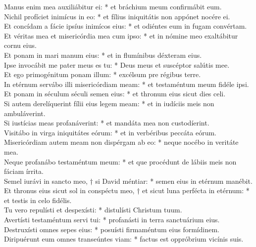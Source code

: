 {	%
	Manus enim mea auxiliábitur ei: * et bráchium meum confirmábit eum. \\
	Nichil profíciet inimícus in eo: * et fílius iniquitátis non appónet nocére ei. \\
	Et concídam a fácie ipsíus inimícos eius: * et odiéntes eum in fugam convértam. \\
	Et véritas mea et misericórdia mea cum ipso: * et in nómine meo exaltábitur cornu eius. \\
	Et ponam in mari manum eius: * et in flumínibus déxteram eius. \\
	Ipse invocábit me pater meus es tu: * Deus meus et suscéptor salútis mee. \\
	Et ego primogénitum ponam illum: * excélsum pre régibus terre. \\
	In etérnum servábo illi misericórdiam meam: * et testaméntum meum fidéle ipsi. \\
	Et ponam in séculum séculi semen eius: * et thronum eius sicut dies celi. \\
	Si autem derelíquerint fílii eius legem meam: * et in iudíciis meis non ambuláverint. \\
	Si iustícias meas profanáverint: * et mandáta mea non custodíerint. \\
	Visitábo in virga iniquitátes eórum: * et in verbéribus peccáta eórum. \\
	Misericórdiam autem meam non dispérgam ab eo: * neque nocébo in veritáte mea. \\
	Neque profanábo testaméntum meum: * et que procédunt de lábiis meis non fáciam írrita. \\
	Semel iurávi in sancto meo, † si David méntiar: * semen eius in etérnum manébit. \\
	Et thronus eius sicut sol in conspéctu meo, † et sicut luna perfécta in etérnum: * et testis in celo fidélis. \\
	Tu vero repulísti et despexísti: * distulísti Christum tuum. \\
	Avertísti testaméntum servi tui: * profanásti in terra sanctuárium eius. \\
	Destruxísti omnes sepes eius: * posuísti firmaméntum eius formídinem. \\
	Diripuérunt eum omnes transeúntes viam: * factus est oppróbrium vicínis suis. \\
}
